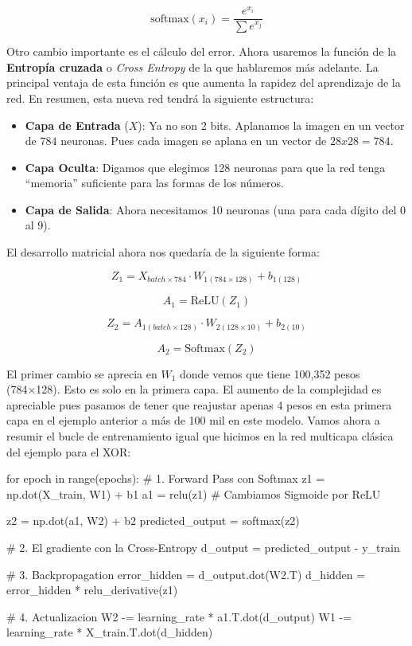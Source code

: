 \documentclass[a4paper,11pt]{article}
\begin{document}
\[
\text{softmax}(x_i) = \frac{e^{x_i}}{\sum e^{x_j}}
\]

Otro cambio importante es el cálculo del error. Ahora usaremos la
función de la \textbf{Entropía cruzada} o \emph{Cross Entropy} de la que
hablaremos más adelante. La principal ventaja de esta función es que
aumenta la rapidez del aprendizaje de la red. En resumen, esta nueva red
tendrá la siguiente estructura:

\begin{itemize}
\item
  \textbf{Capa de Entrada} (\(X\)): Ya no son 2 bits. Aplanamos la
  imagen en un vector de \(784\) neuronas. Pues cada imagen se aplana en
  un vector de \(28x28 = 784\).
\item
  \textbf{Capa Oculta}: Digamos que elegimos 128 neuronas para que la
  red tenga ``memoria'' suficiente para las formas de los números.
\item
  \textbf{Capa de Salida}: Ahora necesitamos 10 neuronas (una para cada
  dígito del 0 al 9).
\end{itemize}

El desarrollo matricial ahora nos quedaría de la siguiente forma:

\[Z_1 = X_{batch \times 784} \cdot W_{1 (784 \times 128)} + b_{1 (128)}\]

\[A_1 = \text{ReLU}(Z_1)\]

\[Z_2 = A_{1 (batch \times 128)} \cdot W_{2 (128 \times 10)} + b_{2 (10)}\]

\[A_2 = \text{Softmax}(Z_2)\]

El primer cambio se aprecia en \(W_1\) donde vemos que tiene 100,352
pesos (784×128). Esto es solo en la primera capa. El aumento de la
complejidad es apreciable pues pasamos de tener que reajustar apenas 4
pesos en esta primera capa en el ejemplo anterior a más de 100 mil en
este modelo. Vamos ahora a resumir el bucle de entrenamiento igual que
hicimos en la red multicapa clásica del ejemplo para el XOR:

\begin{codigo}
for epoch in range(epochs):
    # 1. Forward Pass con Softmax
    z1 = np.dot(X_train, W1) + b1
    a1 = relu(z1)  # Cambiamos Sigmoide por ReLU
    
    z2 = np.dot(a1, W2) + b2
    predicted_output = softmax(z2) 
    
    # 2. El gradiente con la Cross-Entropy
    d_output = predicted_output - y_train 
    
    # 3. Backpropagation
    error_hidden = d_output.dot(W2.T)
    d_hidden = error_hidden * relu_derivative(z1)
    
    # 4. Actualizacion
    W2 -= learning_rate * a1.T.dot(d_output)
    W1 -= learning_rate * X_train.T.dot(d_hidden)
\end{codigo}
\end{document}
